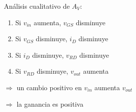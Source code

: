 \begin{frame}[t]
\begin{columns}
\begin{column}{0.6\textwidth}
            \vspace{5mm}
            Análisis cualitativo de $A_V$:

            \begin{enumerate}
                \item Si $v_{in}$ aumenta, $v_{GS}$ disminuye
                \item Si $v_{GS}$ disminuye, $i_D$ disminuye
                \item Si $i_D$ disminuye, $v_{RD}$ disminuye
                \item Si $v_{RD}$ disminuye, $v_{out}$ aumenta
            \end{enumerate}

            $\Rightarrow$ un cambio positivo en $v_{in}$ aumenta $v_{out}$

            $\Rightarrow$ la ganancia es positiva

        \end{column}
    \end{columns}
\end{frame}


